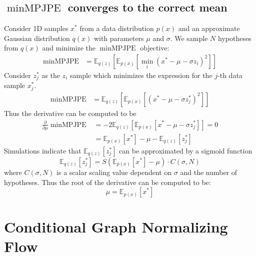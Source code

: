 \documentclass{article} \usepackage{iclr2023_conference,times}
\begin{document}
\subsection{$\operatorname{minMPJPE}$ converges to the correct mean}
\label{app_sec:mpjpe_mean}
Consider 1D samples $x^*$ from a data distribution $p(x)$ and an approximate Gaussian distribution $q(x)$ with parameters $\mu$ and $\sigma$.
We sample $N$ hypotheses from $q(x)$ and minimize the $\operatorname{minMPJPE}$ objective:
\begin{align*}
    \operatorname{minMPJPE} &= \mathbb{E}_{q(z)}\left[\mathbb{E}_{p(x)}\left[\min_i (x^* - \mu - \sigma z_i)^2\right]\right]
\end{align*}
Consider $z_j^*$ as the $z_i$ sample which minimizes the expression for the $j$-th data sample $x^*_j$.
\begin{align*}
    \operatorname{minMPJPE} &= \mathbb{E}_{q(z)}\left[\mathbb{E}_{p(x)}\left[(x^* - \mu - \sigma z^*_j)^2\right]\right]
\end{align*}
Thus the derivative can be computed to be
\begin{align*}
    \frac{\partial}{\partial \mu}\operatorname{minMPJPE} &= -2\mathbb{E}_{q(z)}\left[\mathbb{E}_{p(x)}\left[x^* - \mu - \sigma z^*_j\right]\right] = 0\\
    &= \mathbb{E}_{p(x)}\left[x^*\right] - \mu - \mathbb{E}_{q(z)}\left[z^*_j\right]
\end{align*}
Simulations indicate that $\mathbb{E}_{q(z)}\left[z^*_j\right]$ can be approximated by a sigmoid function
\begin{equation*}
    \mathbb{E}_{q(z)}\left[z^*_j\right] = S\left(\mathbb{E}_{p(x)}\left[x^*\right] - \mu\right) \cdot C(\sigma, N)
\end{equation*}
where $C(\sigma, N)$ is a scalar scaling value dependent on $\sigma$ and the number of hypotheses.
Thus the root of the derivative can be computed to be:
\begin{equation*}
    \mu = \mathbb{E}_{p(x)}\left[x^*\right] 
\end{equation*}

\section{Conditional Graph Normalizing Flow}
\end{document}
